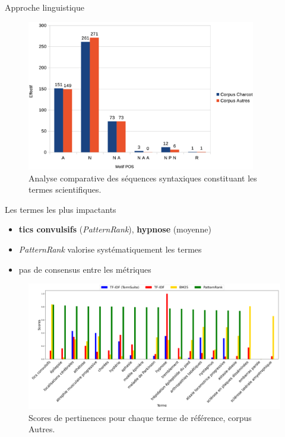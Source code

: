 \begin{frame}{Approche linguistique}
		\begin{figure}[!ht]
		\centering
		\includegraphics[width=100mm,scale=0.5]{pic/repartition_motifs_POS.png}
		\caption{Analyse comparative des séquences syntaxiques constituant les termes scientifiques.}
		\label{fig:enter-label}
	\end{figure}
\end{frame}




\begin{frame}{Les termes les plus impactants}
	\begin{itemize}
		\item  \textbf{tics convulsifs} (\textit{PatternRank}), \textbf{hypnose} (moyenne)
		\item \textit{PatternRank} valorise systématiquement les termes
		\item pas de consensus entre les métriques
	\end{itemize}
	\begin{figure}[h]
		\centering
		\includegraphics[width=\linewidth]{pic/termes_viz.png}
		\caption{Scores de pertinences pour chaque terme de référence, corpus \og{}Autres\fg{}.}
		\label{fig:ling_out_TAL}
	\end{figure}
\end{frame}

